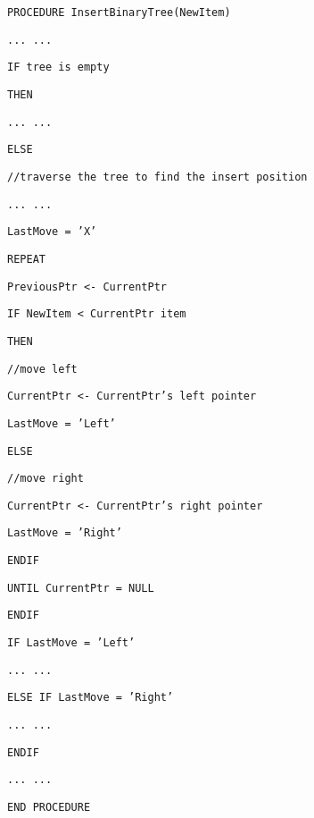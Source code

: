 \noindent %
\noindent\begin{minipage}[t]{1\columnwidth}%
\texttt{PROCEDURE InsertBinaryTree(NewItem)}

\texttt{\qquad{}... ... }

\texttt{\qquad{}IF tree is empty }

\texttt{\qquad{}\qquad{}THEN }

\texttt{\qquad{}\qquad{}\qquad{}... ...}

\texttt{\qquad{}ELSE}

\texttt{\qquad{}\qquad{}//traverse the tree to find the insert position }

\texttt{\qquad{}\qquad{}... ... }

\texttt{\qquad{}\qquad{}LastMove = 'X'}

\texttt{\qquad{}\qquad{}REPEAT}

\texttt{\qquad{}\qquad{}\qquad{}PreviousPtr <- CurrentPtr }

\texttt{\qquad{}\qquad{}\qquad{}IF NewItem < CurrentPtr item}

\texttt{\qquad{}\qquad{}\qquad{}\qquad{}THEN }

\texttt{\qquad{}\qquad{}\qquad{}\qquad{}\qquad{}//move left}

\texttt{\qquad{}\qquad{}\qquad{}\qquad{}\qquad{}CurrentPtr <-
CurrentPtr's left pointer}

\texttt{\qquad{}\qquad{}\qquad{}\qquad{}\qquad{}LastMove = 'Left' }

\texttt{\qquad{}\qquad{}\qquad{}\qquad{}ELSE}

\texttt{\qquad{}\qquad{}\qquad{}\qquad{}\qquad{}//move right }

\texttt{\qquad{}\qquad{}\qquad{}\qquad{}\qquad{}CurrentPtr <-
CurrentPtr's right pointer }

\texttt{\qquad{}\qquad{}\qquad{}\qquad{}\qquad{}LastMove = 'Right'}

\texttt{\qquad{}\qquad{}\qquad{}ENDIF }

\texttt{\qquad{}\qquad{}UNTIL CurrentPtr = NULL }

\texttt{\qquad{}ENDIF }

\texttt{\qquad{}IF LastMove = 'Left'}

\texttt{\qquad{}... ... }

\texttt{\qquad{}ELSE IF LastMove = 'Right'}

\texttt{\qquad{}... ...}

\texttt{\qquad{}ENDIF }

\texttt{\qquad{}... ... }

\texttt{END PROCEDURE }%
\end{minipage}

